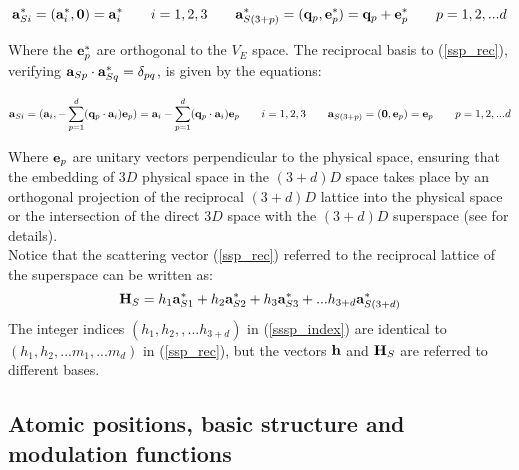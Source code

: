 \documentclass[10pt]{article}
\begin{document}
\begin{equation} \label{ssp_rec}
{\bf a}_{Si}^* = ({\bf a}_{i}^*,{\bf 0})={\bf a}_{i}^*  \qquad i=1,2,3 \qquad {\bf a}_{S(3+p)}^* = ({\bf q}_{p},{\bf e}_{p}^*)={\bf q}_{p}+{\bf e}_{p}^* \qquad p=1,2,...d 
\end{equation}

Where the ${\bf e}_{p}^*$ are orthogonal to the $V_E$ space. The reciprocal basis to (\ref{ssp_rec}), verifying ${\bf a}_{Sp} \cdot {\bf a}_{Sq}^* = \delta_{pq}$, is given by the equations:

\begin{equation} \label{ssp_dir}
{\bf a}_{Si} = ({\bf a}_{i},-\sum\limits_{p=1}^{d} ({\bf q}_p \cdot {\bf a}_i) {\bf e}_{p})={\bf a}_{i}-\sum\limits_{p=1}^{d} ({\bf q}_p \cdot {\bf a}_i) {\bf e}_{p}  \qquad i=1,2,3 \qquad {\bf a}_{S(3+p)} = ({\bf 0},{\bf e}_{p})={\bf e}_{p} \qquad p=1,2,...d 
\end{equation}

Where ${\bf e}_p$ are unitary vectors perpendicular to the physical space, ensuring that the embedding of $3D$ physical space in the $(3+d)D$ space takes place by an orthogonal projection of the reciprocal $(3+d)D$ lattice into the physical space or the intersection of the direct $3D$ space with the $(3+d)D$ superspace (see \cite{Janner,van Smaalen} for details).\\ 
Notice that the scattering vector (\ref{ssp_rec}) referred to the reciprocal lattice of the superspace can be written as:
\begin{equation} \label{sssp_index}
{\bf H}_S=h_1{\bf a}_{S1}^*+h_2{\bf a}_{S2}^*+h_3{\bf a}_{S3}^*+... h_{3+d}{\bf a}_{S(3+d)}^*
\end{equation}
The integer indices $(h_1,h_2,, ...h_{3+d})$ in (\ref{sssp_index}) are identical to $(h_1,h_2, ... m_1,...m_d)$ in (\ref{ssp_rec}), but the vectors ${\bf h}$ and ${\bf H}_S$ are referred to different bases.


\subsection{Atomic positions, basic structure and modulation functions}
\label{atom_pos}
\end{document}
